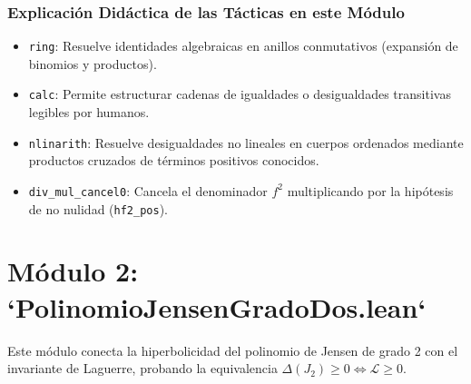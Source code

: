 \documentclass[11pt,a4paper]{article}
\theoremstyle{definition}
\theoremstyle{remark}
\begin{document}
\subsubsection*{Explicación Didáctica de las Tácticas en este Módulo}
\begin{itemize}
    \item \texttt{ring}: Resuelve identidades algebraicas en anillos conmutativos (expansión de binomios y productos).
    \item \texttt{calc}: Permite estructurar cadenas de igualdades o desigualdades transitivas legibles por humanos.
    \item \texttt{nlinarith}: Resuelve desigualdades no lineales en cuerpos ordenados mediante productos cruzados de términos positivos conocidos.
    \item \texttt{div\_mul\_cancel0}: Cancela el denominador $f^2$ multiplicando por la hipótesis de no nulidad (\texttt{hf2\_pos}).
\end{itemize}

\section{Módulo 2: `PolinomioJensenGradoDos.lean`}

Este módulo conecta la hiperbolicidad del polinomio de Jensen de grado 2 con el invariante de Laguerre, probando la equivalencia $\Delta(J_2) \ge 0 \iff \mathcal{L} \ge 0$.
\end{document}
